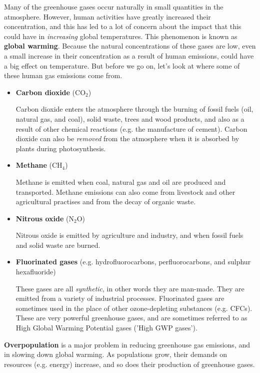 Many of the greenhouse gases occur naturally in small quantities in the atmosphere. However, human activities have greatly increased their concentration, and this has led to a lot of concern about the impact that this could have in \textit{increasing} global temperatures. This phenomenon is known as \textbf{global warming}. Because the natural concentrations of these gases are low, even a small increase in their concentration as a result of human emissions, could have a big effect on temperature. But before we go on, let's look at where some of these human gas emissions come from.

\begin{itemize}

\item{\textbf{Carbon dioxide} (CO$_{2}$)

Carbon dioxide enters the atmosphere through the burning of fossil fuels (oil, natural gas, and coal), solid waste, trees and wood products, and also as a result of other chemical reactions (e.g. the manufacture of cement). Carbon dioxide can also be \textit{removed} from the atmosphere when it is absorbed by plants during photosynthesis.}

\item{\textbf{Methane} (CH$_{4}$)

Methane is emitted when coal, natural gas and oil are produced and transported. Methane emissions can also come from livestock and other agricultural practises and from the decay of organic waste.}

\item{\textbf{Nitrous oxide} (N$_{2}$O)

Nitrous oxide is emitted by agriculture and industry, and when fossil fuels and solid waste are burned.}

\item{\textbf{Fluorinated gases} (e.g. hydrofluorocarbons, perfluorocarbons, and sulphur hexafluoride)

These gases are all \textit{synthetic}, in other words they are man-made. They are emitted from a variety of industrial processes. Fluorinated gases are sometimes used in the place of other ozone-depleting substances (e.g. CFCs). These are very powerful greenhouse gases, and are sometimes referred to as High Global Warming Potential gases ('High GWP gases').}

\end{itemize}

\textbf{Overpopulation} is a major problem in reducing greenhouse gas emissions, and in slowing down global warming. As populations grow, their demands on resources (e.g. energy) increase, and so does their production of greenhouse gases.\\

